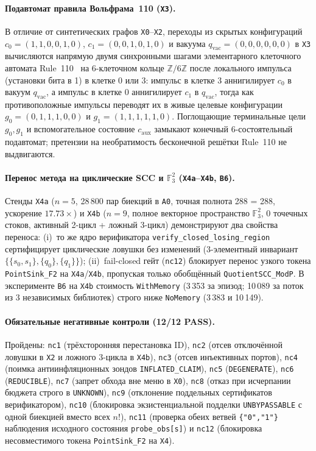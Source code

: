 \documentclass[10pt,a4paper]{article}
\newcommand{\code}[1]{\nolinkurl{#1}}
\begin{document}
\paragraph{Подавтомат правила Вольфрама~110 (\code{X3}).}
В отличие от синтетических графов \texttt{X0}--\texttt{X2}, переходы из скрытых конфигураций $c_0 = (1,1,0,0,1,0)$, $c_1 = (0,0,1,0,1,0)$ и вакуума $q_{\mathrm{vac}} = (0,0,0,0,0,0)$ в \code{X3} вычисляются напрямую двумя синхронными шагами элементарного клеточного автомата Rule~110~\cite{wolfram1983,cook2004} на 6-клеточном кольце $\mathbb{Z}/6\mathbb{Z}$ после локального импульса (установки бита в 1) в клетке 0 или 3: импульс в клетке 3 аннигилирует $c_0$ в вакуум $q_{\mathrm{vac}}$, а импульс в клетке 0 аннигилирует $c_1$ в $q_{\mathrm{vac}}$, тогда как противоположные импульсы переводят их в живые целевые конфигурации $g_0 = (0,1,1,1,0,0)$ и $g_1 = (1,1,1,1,1,0)$. Поглощающие терминальные цели $g_0, g_1$ и вспомогательное состояние $c_{\mathrm{aux}}$ замыкают конечный 6-состоятельный подавтомат; претензии на необратимость бесконечной решётки Rule~110 не выдвигаются.

\paragraph{Перенос метода на циклические SCC и $\mathbb{F}_3^2$ (\texttt{X4a}--\texttt{X4b}, \code{B6}).}
Стенды \code{X4a} ($n=5$, 28\,800 пар биекций в \code{A0}, точная полнота 288 = 288, ускорение $17.73\times$) и \code{X4b} ($n=9$, полное векторное пространство $\mathbb{F}_3^2$, 0 точечных стоков, активный 2-цикл + ложный 3-цикл) демонстрируют два свойства переноса: (i)~то же ядро верификатора \code{verify_closed_losing_region} сертифицирует циклические ловушки без изменений (3-элементный инвариант $\{\{s_0,s_1\}, \{q_0\}, \{q_1\}\}$); (ii)~fail-closed гейт (\code{nc12}) блокирует перенос узкого токена \code{PointSink_F2} на \code{X4a}/\code{X4b}, пропуская только обобщённый \code{QuotientSCC_ModP}. В эксперименте \code{B6} на \code{X4b} стоимость \code{WithMemory} (3\,353 за эпизод; 10\,089 за поток из 3 независимых библиотек) строго ниже \code{NoMemory} (3\,383 и 10\,149).

\paragraph{Обязательные негативные контроли (12/12 PASS).}
Пройдены: \code{nc1} (трёхсторонняя перестановка ID), \code{nc2} (отсев отключённой ловушки в \code{X2} и ложного 3-цикла в \code{X4b}), \code{nc3} (отсев инъективных портов), \code{nc4} (поимка антиинфляционных зондов \code{INFLATED_CLAIM}), \code{nc5} (\code{DEGENERATE}), \code{nc6} (\code{REDUCIBLE}), \code{nc7} (запрет обхода вне меню в \code{X0}), \code{nc8} (отказ при исчерпании бюджета строго в \code{UNKNOWN}), \code{nc9} (отклонение поддельных сертификатов верификатором), \code{nc10} (блокировка экзистенциальной подделки \code{UNBYPASSABLE} с одной биекцией вместо всех $n!$), \code{nc11} (проверка обеих ветвей \texttt{\{"0","1"\}} наблюдения исходного состояния \code{probe_obs[s]}) и \code{nc12} (блокировка несовместимого токена \code{PointSink_F2} на \code{X4}).
\end{document}
